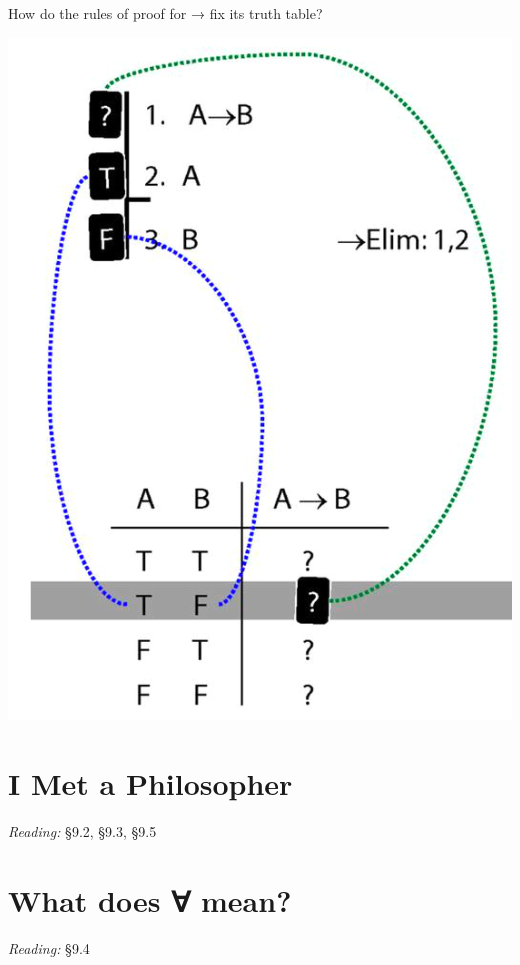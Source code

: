 \documentclass[12pt]{extarticle}
\begin{document}
\begin{multicols*}{3}
How do the rules of proof for → fix its truth table?
 
\begin{center}
\includegraphics[scale=0.3]{img/unit_700_rule_to_tt.png}
\end{center}
 
 
\section{I Met a Philosopher}
 
\emph{Reading:} §9.2, §9.3, §9.5
 
 
 
 
 
 
\section{What does ∀ mean?}
 
\emph{Reading:} §9.4
 

\end{multicols*}
\end{document}
